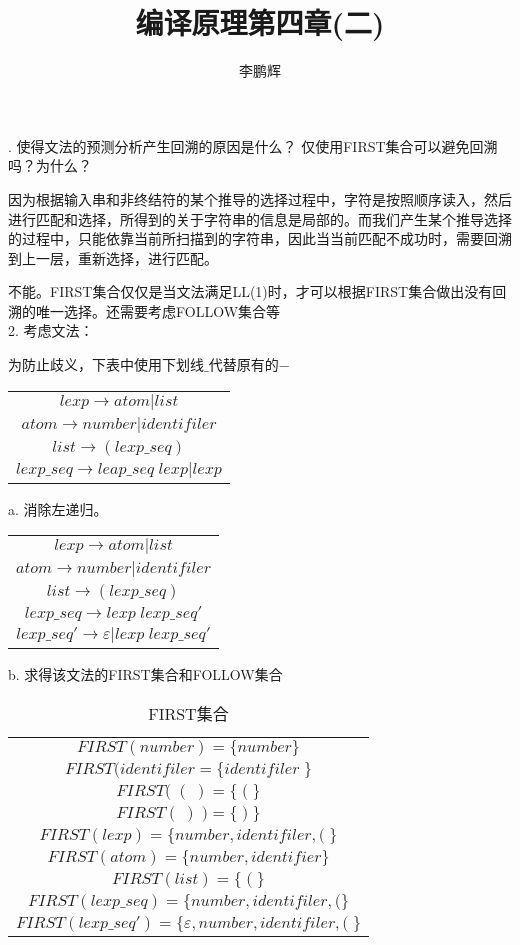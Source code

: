 \documentclass[a4paper, 10pt]{article}
\title{编译原理第四章(二)}
\author{李鹏辉}
\begin{document}
. 使得文法的预测分析产生回溯的原因是什么？ 仅使用FIRST集合可以避免回溯吗？为什么？

因为根据输入串和非终结符的某个推导的选择过程中，字符是按照顺序读入，然后进行匹配和选择，所得到的关于字符串的信息是局部的。而我们产生某个推导选择的过程中，只能依靠当前所扫描到的字符串，因此当当前匹配不成功时，需要回溯到上一层，重新选择，进行匹配。

不能。FIRST集合仅仅是当文法满足LL(1)时，才可以根据FIRST集合做出没有回溯的唯一选择。还需要考虑FOLLOW集合等\\

2. 考虑文法：

为防止歧义，下表中使用下划线$\_$代替原有的$-$
\begin{table}[H]
\centering
\begin{tabular}{c}
\hline
$lexp \rightarrow atom | list$\\
$atom \rightarrow number | identifiler$\\
$list \rightarrow (lexp\_seq)$\\
$lexp\_seq \rightarrow leap\_seq\;lexp | lexp$\\
\hline
\end{tabular}
\end{table}
a. 消除左递归。
\begin{table}[H]
\centering
\begin{tabular}{c}
\hline
$lexp \rightarrow atom | list$\\
$atom \rightarrow number | identifiler$\\
$list \rightarrow (lexp\_seq)$\\
$lexp\_seq \rightarrow lexp \; lexp\_seq'$\\
$lexp\_seq' \rightarrow \varepsilon | lexp \; lexp\_seq'$\\
\hline
\end{tabular}
\end{table}

b. 求得该文法的FIRST集合和FOLLOW集合

\begin{table}[H]
\centering
\caption{FIRST集合}
\begin{tabular}{c}
\hline
$FIRST(number) = \{number \}$\\
$FIRST(identifiler = \{identifiler \; \}$\\
$FIRST(\;(\;) = \{ \; ( \; \}$\\
$FIRST(\; ) \;) = \{ \; )\; \}$\\
$FIRST(lexp) = \{number, identifiler, ( \; \}$\\
$FIRST(atom) = \{number, identifier \}$\\
$FIRST(list) = \{\; ( \; \}$\\
$FIRST(lexp\_seq) = \{ number, identifiler, ( \}$\\
$FIRST(lexp\_seq') = \{ \varepsilon ,number, identifiler, ( \; \}$\\
\hline
\end{tabular}
\end{table}
\end{document}
